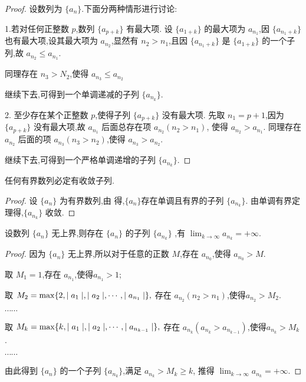 \begin{proof}
    设数列为 $\{a_n\}$.下面分两种情形进行讨论:

    1.若对任何正整数 $p$,数列 $\{a_{p+k}\}$ 有最大项. 设 $\{a_{1+k}\}$ 的最大项为 $a_{n_1}$,因 $\{a_{n_1+k}\}$ 也有最大项,设其最大项为 $a_{n_2}$,显然有 $n_2>n_1$,且因 $\{a_{n_1+k}\}$ 是 $\{a_{1+k}\}$ 的一个子列,故 $a_{n_2}\le a_{n_1}$.

    同理存在 $n_3>N_2$,使得 $a_{n_3}\le a_{n_2}$

    继续下去,可得到一个单调递减的子列 $\{a_{n_k}\}$.

    2. 至少存在某个正整数 $p$,使得子列 $\{a_{p+k}\}$ 没有最大项. 先取 $n_1=p+1$,因为 $\{a_{p+k}\}$ 没有最大项,故 $a_{n_1}$ 后面总存在项 $a_{n_2}(n_2>n_1)$, 使得 $a_{n_2}>a_{n_1}$. 同理存在 $a_{n_2}$ 后面的项 $a_{n_3}(n_3>n_2)$,使得 $a_{n_3}>a_{n_2}$.
    
    继续下去,可得到一个严格单调递增的子列 $\{a_{n_k}\}$.
\end{proof}

\begin{theorem}[致密性定理]
    任何有界数列必定有收敛子列.
\end{theorem}

\begin{proof}
    设 $\{a_n\}$ 为有界数列,由 得,$\{a_n\}$存在单调且有界的子列 $\{a_{n_k}\}$. 由单调有界定理得,$\{a_{n_k}\}$ 收敛.
\end{proof}

\begin{example}
    设数列 $\{a_n\}$ 无上界,则存在 $\{a_n\}$ 的子列 $\{a_{n_k}\}$ ,有 $\lim_{k\to\infty} a_{n_k}=+\infty$.
\end{example}

\begin{proof}
    因为 $\{a_n\}$ 无上界,所以对于任意的正数 $M$,存在 $a_{n_0}$,使得 $a_{n_0}>M$.

    取 $M_1=1$,存在 $a_{n_1}$,使得$a_{n_1}>1$;

    取 $M_2=\max\{2,\mid a_1 \mid,\mid a_2 \mid,\cdots,\mid a_{n_1} \mid\},$ 存在 $a_{n_2}(n_2>n_1)$,使得$a_{n_2}>M_2$.

    $\cdots\cdots$

    取 $M_k=\max\{k,\mid a_1 \mid,\mid a_2 \mid,\cdots,\mid a_{n_{k-1}} \mid\},$ 存在 $a_{n_k}(a_{n_{k}}>a_{n_{k-1}})$,使得$a_{n_k}>M_k$.

    $\cdots\cdots$

    由此得到 $\{a_n\}$ 的一个子列 $\{a_{n_k}\}$,满足 $a_{n_k}>M_k\ge k$, 推得 $\lim_{k\to\infty} a_{n_k}=+\infty$.
\end{proof}

